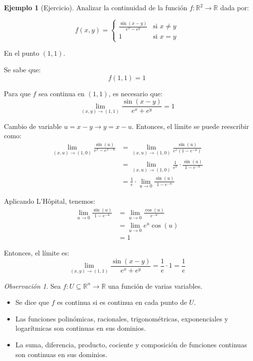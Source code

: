 \documentclass{article}
\newcommand{\R}{\mathbb{R}}
\theoremstyle{definition}
\newtheorem{example}[definition]{Ejemplo}
\theoremstyle{plain}
\theoremstyle{remark}
\newtheorem{remark}[definition]{Observación}
\theoremstyle{corollary}
\begin{document}
\begin{example}[Ejercicio]
Analizar la continuidad de la función $f : \R^2 \to \R$ dada por:

\[
f(x, y) = \begin{cases}
\frac{\sin(x - y) }{e^x - e^y} & \text{si } x \neq y \\
1 & \text{si } x = y
\end{cases}
\]

En el punto $(1, 1)$.

Se sabe que:
\[
f(1, 1) = 1
\]

Para que $f$ sea continua en $(1, 1)$, es necesario que:
\[
\lim_{(x, y) \to (1, 1)} \frac{\sin(x - y)}{e^x + e^y} = 1
\]

Cambio de variable $u = x - y \rightarrow y = x - u$. Entonces, el límite se puede reescribir como:
\begin{align*}
\lim_{(x, u) \to (1, 0)} \frac{\sin(u)}{e^x - e^{x - u}} &= \lim_{(x, u) \to (1, 0)} \frac{\sin(u)}{e^x (1 - e^{-u})} \\
&= \lim_{(x, u) \to (1, 0)} \frac{1}{e^x} \cdot \frac{\sin(u)}{1 - e^{-u}} \\
&= \frac{1}{e} \cdot \lim_{u \to 0} \frac{\sin(u)}{1 - e^{-u}}
\end{align*}

Aplicando L'Hôpital, tenemos:
\begin{align*}
\lim_{u \to 0} \frac{\sin(u)}{1 - e^{-u}} &= \lim_{u \to 0} \frac{\cos(u)}{e^{-u}} \\
&= \lim_{u \to 0} e^u \cos(u) \\
&= 1
\end{align*}

Entonces, el límite es:
\[
\lim_{(x, y) \to (1, 1)} \frac{\sin(x - y)}{e^x + e^y} = \frac{1}{e} \cdot 1 = \frac{1}{e}
\]

\end{example}

\begin{remark}
Sea $f : U \subseteq \R^n \to \R$ una función de varias variables.
\begin{itemize}
\item Se dice que $f$ es continua si es continua en cada punto de $U$.
\item Las funciones polinómicas, racionales, trigonométricas, exponenciales y logarítmicas son continuas en sus dominios.
\item La suma, diferencia, producto, cociente y composición de funciones continuas son continuas en sus dominios.
\end{itemize}

\end{remark}
\end{document}
